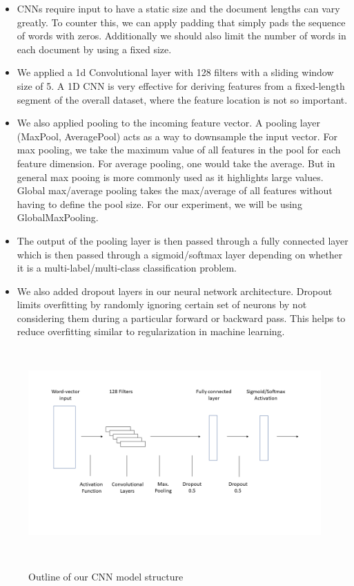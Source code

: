 \begin{itemize}

\item{CNNs require input to have a static size and the document lengths can vary greatly. To counter this, we can apply padding that simply pads the sequence of words with zeros. Additionally we should also limit the number of words in each document by using a fixed size.}

\item{We applied a 1d Convolutional layer with 128 filters with a sliding window size of 5. A 1D CNN is very effective for deriving features from a fixed-length segment of the overall dataset, where the feature location is not so important.}

\item{We also applied pooling to the incoming feature vector. A pooling layer (MaxPool, AveragePool) acts as a way to downsample the input vector. For max pooling, we take the maximum value of all features in the pool for each feature dimension. For average pooling, one would take the average. But in general max pooing is more commonly used as it highlights large values. Global max/average pooling takes the max/average of all features without having to define the pool size. For our experiment, we will be using GlobalMaxPooling.}

\item{The output of the pooling layer is then passed through a fully connected layer which is then passed through a sigmoid/softmax layer depending on whether it is a multi-label/multi-class classification problem.}

\item{We also added dropout layers in our neural network architecture. Dropout limits overfitting by randomly ignoring certain set of neurons by not considering them during a particular forward or backward pass. This helps to reduce overfitting similar to regularization in machine learning.}

\end{itemize}

\begin{figure}[htbp]
\centering
\includegraphics[width=16cm, height=8cm]{images/cnn.png}\\
\centering
\caption{Outline of our CNN model structure}
\label{fig:foo}
\end{figure}

